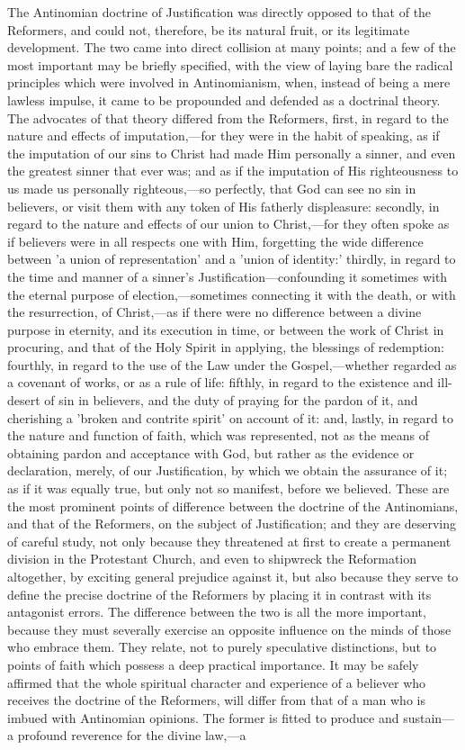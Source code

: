 \documentclass[
]{book}
\begin{document}
The Antinomian doctrine of Justification was directly opposed to that of the Reformers, and could not, therefore, be its natural fruit, or its legitimate development. The two came into direct collision at many points; and a few of the most important may be briefly specified, with the view of laying bare the radical principles which were involved in Antinomianism, when, instead of being a mere lawless impulse, it came to be propounded and defended as a doctrinal theory. The advocates of that theory differed from the Reformers, first, in regard to the nature and effects of imputation,---for they were in the habit of speaking, as if the imputation of our sins to Christ had made Him personally a sinner, and even the greatest sinner that ever was; and as if the imputation of His righteousness to us made us personally righteous,---so perfectly, that God can see no sin in believers, or visit them with any token of His fatherly displeasure: secondly, in regard to the nature and effects of our union to Christ,---for they often spoke as if believers were in all respects one with Him, forgetting the wide difference between 'a union of representation' and a 'union of identity:' thirdly, in regard to the time and manner of a sinner's Justification---confounding it sometimes with the eternal purpose of election,---sometimes connecting it with the death, or with the resurrection, of Christ,---as if there were no difference between a divine purpose in eternity, and its execution in time, or between the work of Christ in procuring, and that of the Holy Spirit in applying, the blessings of redemption: fourthly, in regard to the use of the Law under the Gospel,---whether regarded as a covenant of works, or as a rule of life: fifthly, in regard to the existence and ill-desert of sin in believers, and the duty of praying for the pardon of it, and cherishing a 'broken and contrite spirit' on account of it: and, lastly, in regard to the nature and function of faith, which was represented, not as the means of obtaining pardon and acceptance with God, but rather as the evidence or declaration, merely, of our Justification, by which we obtain the assurance of it; as if it was equally true, but only not so manifest, before we believed. These are the most prominent points of difference between the doctrine of the Antinomians, and that of the Reformers, on the subject of Justification; and they are deserving of careful study, not only because they threatened at first to create a permanent division in the Protestant Church, and even to shipwreck the Reformation altogether, by exciting general prejudice against it, but also because they serve to define the precise doctrine of the Reformers by placing it in contrast with its antagonist errors. The difference between the two is all the more important, because they must severally exercise an opposite influence on the minds of those who embrace them. They relate, not to purely speculative distinctions, but to points of faith which possess a deep practical importance. It may be safely affirmed that the whole spiritual character and experience of a believer who receives the doctrine of the Reformers, will differ from that of a man who is imbued with Antinomian opinions. The former is fitted to produce and sustain---a profound reverence for the divine law,---a 
\end{document}
